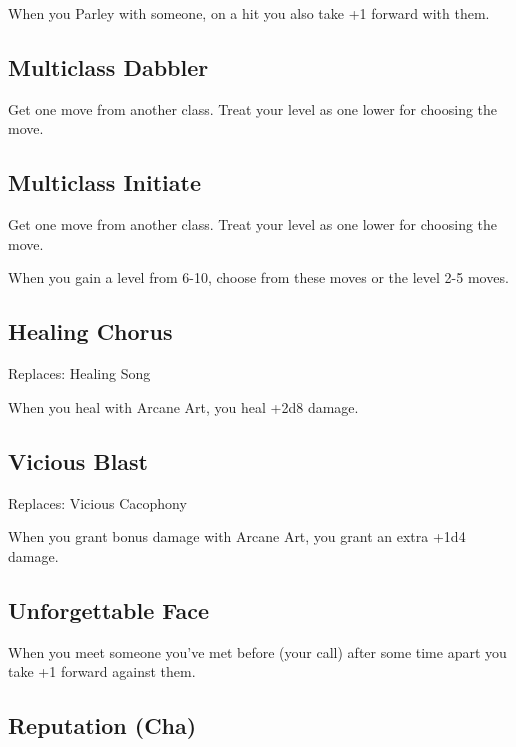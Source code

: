 When you Parley with someone, on a hit you also take +1 forward with them.

 
\subsection{Multiclass Dabbler}    
 

Get one move from another class. Treat your level as one lower for choosing the move.

 
\subsection{Multiclass Initiate}    
 

Get one move from another class. Treat your level as one lower for choosing the move.

 
\startInstructions
When you gain a level from 6-10, choose from these moves or the level 2-5 moves.
\stopInstructions
 
\subsection{Healing Chorus}   
 

Replaces: Healing Song

 

When you heal with Arcane Art, you heal +2d8 damage.

 
\subsection{Vicious Blast}    
 

Replaces: Vicious Cacophony

 

When you grant bonus damage with Arcane Art, you grant an extra +1d4 damage.

 
\subsection{Unforgettable Face}    
 

When you meet someone you've met before (your call) after some time apart you take +1 forward against them.

 
\subsection{Reputation (Cha)}    
 

